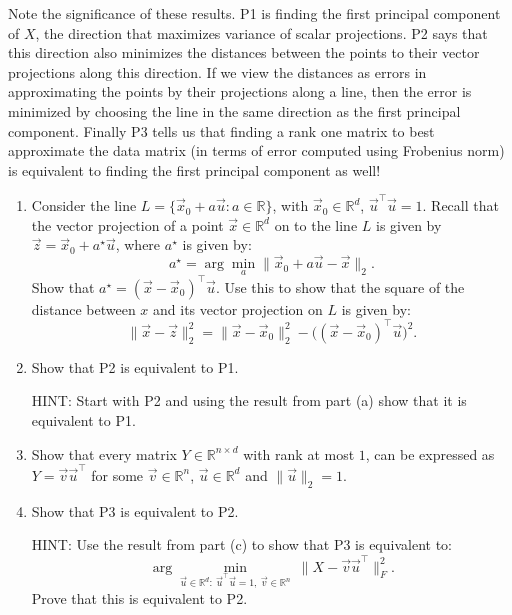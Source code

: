\documentclass[
  12pt,
]{fphw}
\begin{document}
Note the significance of these results. P1 is finding the first principal component of $X$, the direction that
maximizes variance of scalar projections. P2 says that this direction also minimizes the distances between the
points to their vector projections along this direction. If we view the distances as errors in approximating the
points by their projections along a line, then the error is minimized by choosing the line in the same direction
as the first principal component. Finally P3 tells us that finding a rank one matrix to best approximate the data
matrix (in terms of error computed using Frobenius norm) is equivalent to finding the first principal component
as well!

\begin{enumerate}
\item[(a)] Consider the line $L = \{\vec x_0 + a\vec u : a \in \mathbb{R}\}$, with $\vec x_0 \in \mathbb{R}^d$, $\vec u^\top \vec u = 1$. Recall that the vector projection of a
point $\vec x \in \mathbb{R}^d$ on to the line $L$ is given by $\vec z = \vec x_0 + a^\star \vec u$, where $a^\star$
is given by:
\[
a^\star = \arg\min_a \|\vec x_0 + a\vec u - \vec x\|_2. \tag{14}
\]
Show that $a^\star = (\vec x - \vec x_0)^\top \vec u$. Use this to show that the square of the distance between $x$ and its vector
projection on $L$ is given by:
\[
\|\vec x - \vec z\|_2^2 = \|\vec x - \vec x_0\|_2^2 - \big((\vec x - \vec x_0)^\top \vec u\big)^2. \tag{15}
\]

\item[(b)] Show that P2 is equivalent to P1.

HINT: Start with P2 and using the result from part (a) show that it is equivalent to P1.

\item[(c)] Show that every matrix $Y \in \mathbb{R}^{n\times d}$ with rank at most $1$, can be expressed as $Y = \vec v \vec u^\top$ for some $\vec v \in \mathbb{R}^n$,
$\vec u \in \mathbb{R}^d$ and $\|\vec u\|_2 = 1$.

\item[(d)] Show that P3 is equivalent to P2.

HINT: Use the result from part (c) to show that P3 is equivalent to:
\[
\arg\min_{\vec u\in\mathbb{R}^d:\ \vec u^\top\vec u = 1,\ \vec v\in\mathbb{R}^n}\ \|X - \vec v \vec u^\top\|_F^2. \tag{16}
\]
Prove that this is equivalent to P2.
\end{enumerate}
\end{document}
